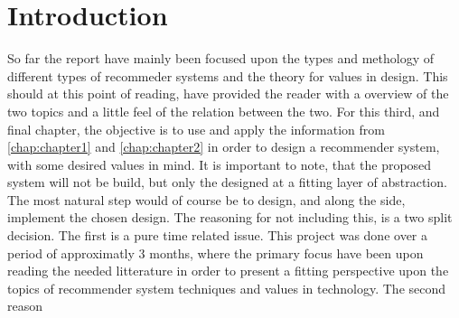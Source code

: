 \section{Introduction}
So far the report have mainly been focused upon the types and methology of different types of recommeder systems and the theory for values in design. This should at this point of reading, have provided the reader with a overview of the two topics and a little feel of the relation between the two. For this third, and final chapter, the objective is to use and apply the information from \ref{chap:chapter1} and \ref{chap:chapter2} in order to design a recommender system, with some desired values in mind. It is important to note, that the proposed system will not be build, but only the designed at a fitting layer of abstraction. The most natural step would of course be to design, and along the side, implement the chosen design. The reasoning for not including this, is a two split decision. The first is a pure time related issue. This project was done over a period of approximatly 3 months, where the primary focus have been upon reading the needed litterature in order to present a fitting perspective upon the topics of recommender system techniques and values in technology. The second reason 